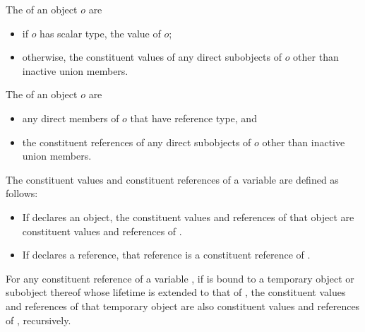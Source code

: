 \documentclass{wg21}
\begin{document}
\begin{addedblock}
The  of an object $o$ are
\begin{itemize}
\item if $o$ has scalar type, the value of $o$;
\item otherwise, the constituent values of any direct subobjects of $o$ other
than inactive union members.
\end{itemize}

The  of an object $o$ are
\begin{itemize}
\item any direct members of $o$ that have reference type, and
\item the constituent references of any direct subobjects of $o$ other than
inactive union members.
\end{itemize}
\end{addedblock}


\begin{addedblock}
The constituent values and constituent references of a variable  are defined as follows:
\begin{itemize}
\item If  declares an object, the constituent values and references of that object are
constituent values and references of .
\item If  declares a reference, that reference is a constituent reference of .
\end{itemize}
For any constituent reference  of a variable , if  is bound to a temporary object or
subobject thereof whose lifetime is extended to that of , the constituent values and
references of that temporary object are also constituent values and references of ,
recursively.
\end{addedblock}

\end{document}
